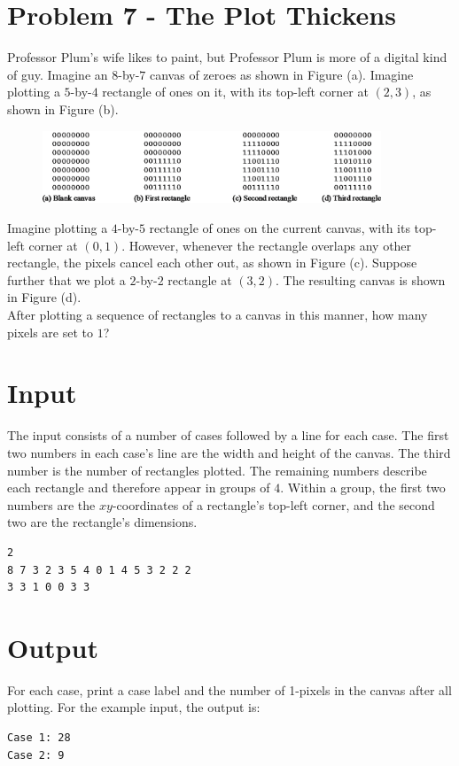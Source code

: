 \documentclass{article}
\begin{document}

\section*{Problem 7 - The Plot Thickens}

Professor Plum’s wife likes to paint, but Professor Plum is more of a digital kind of guy.  Imagine an $8$-by-$7$ canvas of zeroes as shown in Figure (a). Imagine plotting a $5$-by-$4$ rectangle of ones on it, with its top-left corner at $(2, 3)$, as shown in Figure (b).

\begin{figure}[h]
\begin{center}
\includegraphics[width=0.9\textwidth]{problem7chart.png} 
\end{center}
\end{figure}

Imagine plotting a $4$-by-$5$ rectangle of ones on the current canvas, with its top-left corner at $(0, 1)$. However, whenever the rectangle overlaps any other rectangle, the pixels cancel each other out, as shown in Figure (c). Suppose further that we plot a $2$-by-$2$ rectangle at $(3, 2)$. The resulting canvas is shown in Figure (d). \\

After plotting a sequence of rectangles to a canvas in this manner, how many pixels are set to $1$?

\section*{Input}
The input consists of a number of cases followed by a line for each case. The first two numbers in each case’s line are the width and height of the canvas. The third number is the number of rectangles plotted. The remaining numbers describe each rectangle and therefore appear in groups of $4$. Within a group, the first two numbers are the $xy$-coordinates of a rectangle’s top-left corner, and the second two are the rectangle’s dimensions.
\begin{verbatim}
2 
8 7 3 2 3 5 4 0 1 4 5 3 2 2 2 
3 3 1 0 0 3 3
\end{verbatim}

\section*{Output}
For each case, print a case label and the number of 1-pixels in the canvas after all plotting. For the example input, the output is:
\begin{verbatim}
Case 1: 28 
Case 2: 9
\end{verbatim}
\end{document}
